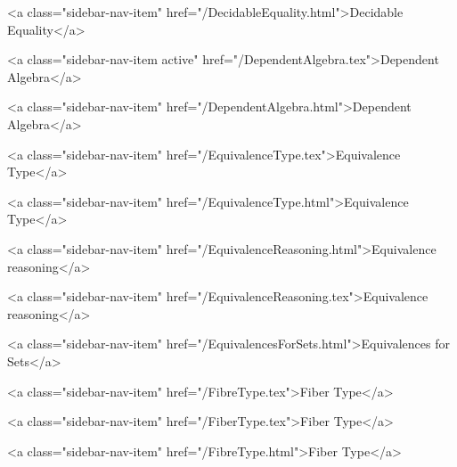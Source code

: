       
    
      
        
          <a class="sidebar-nav-item" href="/DecidableEquality.html">Decidable Equality</a>
        
      
    
      
        
          <a class="sidebar-nav-item active" href="/DependentAlgebra.tex">Dependent Algebra</a>
        
      
    
      
        
          <a class="sidebar-nav-item" href="/DependentAlgebra.html">Dependent Algebra</a>
        
      
    
      
        
          <a class="sidebar-nav-item" href="/EquivalenceType.tex">Equivalence Type</a>
        
      
    
      
        
          <a class="sidebar-nav-item" href="/EquivalenceType.html">Equivalence Type</a>
        
      
    
      
        
          <a class="sidebar-nav-item" href="/EquivalenceReasoning.html">Equivalence reasoning</a>
        
      
    
      
        
          <a class="sidebar-nav-item" href="/EquivalenceReasoning.tex">Equivalence reasoning</a>
        
      
    
      
        
          <a class="sidebar-nav-item" href="/EquivalencesForSets.html">Equivalences for Sets</a>
        
      
    
      
        
          <a class="sidebar-nav-item" href="/FibreType.tex">Fiber Type</a>
        
      
    
      
        
          <a class="sidebar-nav-item" href="/FiberType.tex">Fiber Type</a>
        
      
    
      
        
          <a class="sidebar-nav-item" href="/FibreType.html">Fiber Type</a>
        
